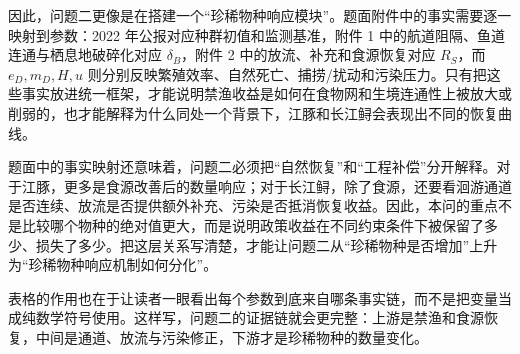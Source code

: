 因此，问题二更像是在搭建一个“珍稀物种响应模块”。题面附件中的事实需要逐一映射到参数：2022 年公报对应种群初值和监测基准，附件 1 中的航道阻隔、鱼道连通与栖息地破碎化对应 \(\delta_B\)，附件 2 中的放流、补充和食源恢复对应 \(R_S\)，而 \(e_D,m_D,H,u\) 则分别反映繁殖效率、自然死亡、捕捞/扰动和污染压力。只有把这些事实放进统一框架，才能说明禁渔收益是如何在食物网和生境连通性上被放大或削弱的，也才能解释为什么同处一个背景下，江豚和长江鲟会表现出不同的恢复曲线\cite{report2022}。

题面中的事实映射还意味着，问题二必须把“自然恢复”和“工程补偿”分开解释。对于江豚，更多是食源改善后的数量响应；对于长江鲟，除了食源，还要看洄游通道是否连续、放流是否提供额外补充、污染是否抵消恢复收益。因此，本问的重点不是比较哪个物种的绝对值更大，而是说明政策收益在不同约束条件下被保留了多少、损失了多少。把这层关系写清楚，才能让问题二从“珍稀物种是否增加”上升为“珍稀物种响应机制如何分化”。

表格的作用也在于让读者一眼看出每个参数到底来自哪条事实链，而不是把变量当成纯数学符号使用。这样写，问题二的证据链就会更完整：上游是禁渔和食源恢复，中间是通道、放流与污染修正，下游才是珍稀物种的数量变化。
